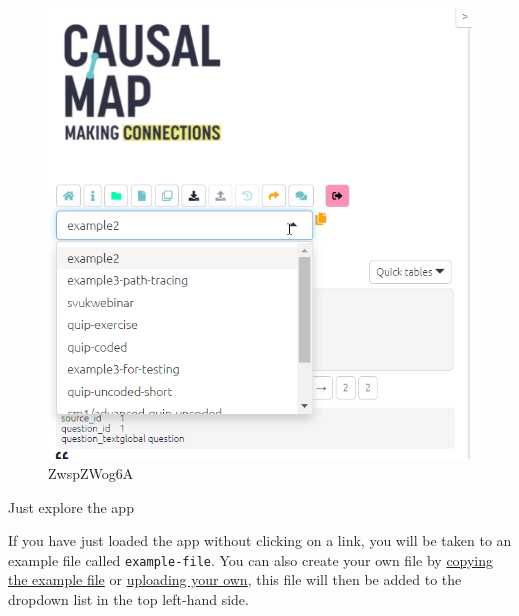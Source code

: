 \documentclass[
]{book}
\begin{document}
\begin{figure}
\centering
\includegraphics[width=6.77083in,height=\textheight]{_assets/ZwspZWog6A.gif}
\caption{ZwspZWog6A}
\end{figure}

Just explore the app

If you have just loaded the app without clicking on a link, you will be taken to an example file called \texttt{example-file}. You can also create your own file by \protect\hyperlink{xown-copy}{copying the example file} or \protect\hyperlink{ximport}{uploading your own}, this file will then be added to the dropdown list in the top left-hand side.
\end{document}
